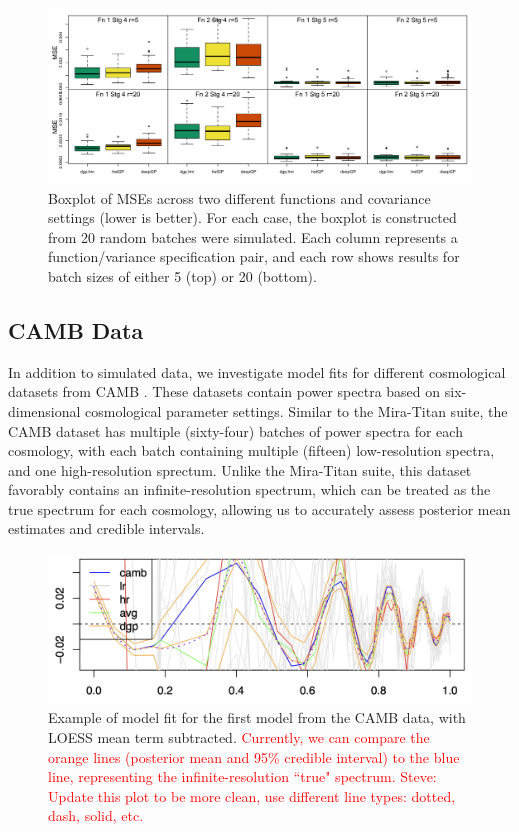 \documentclass[11pt]{article}
\begin{document}
\begin{figure}
    \centering
    \includegraphics[width=6in]{sims_MSE.png}
    \caption{Boxplot of MSEs across two different functions and covariance settings 
             (lower is better). For each case, the boxplot is constructed from 20 
             random batches were simulated. Each column represents a function/variance 
             specification pair, and each row shows results for batch sizes of 
             either 5 (top) or 20 (bottom).}    
    \label{fig:sims_MSE}
\end{figure}

\subsection{CAMB Data}
\label{subsec:camb}

In addition to simulated data, we investigate model fits for different cosmological 
datasets from CAMB \citep{lewis2011CAMB}. These datasets contain power spectra based
on six-dimensional cosmological parameter settings. Similar to the Mira-Titan suite, the
CAMB dataset has multiple (sixty-four) batches of power spectra for each cosmology, with each batch 
containing multiple (fifteen) low-resolution spectra, and one high-resolution sprectum. 
Unlike the Mira-Titan suite, this dataset favorably contains an infinite-resolution 
spectrum, which can be treated as the true spectrum for each cosmology,
allowing us to accurately assess posterior mean estimates and credible intervals. 

\begin{figure}
    \centering
    \includegraphics[width=6in]{CAMB_fit_model1.jpg}
    \caption{Example of model fit for the first model from the CAMB data, with LOESS
             mean term subtracted. \textcolor{red}{Currently, we can compare the 
             orange lines (posterior mean and 95\% credible interval) to the blue line,
             representing the infinite-resolution ``true" spectrum. Steve: Update this plot to be
             more clean, use different line types: dotted, dash, solid, etc.}}   
    \label{fig:fit_camb}
\end{figure}
\end{document}
